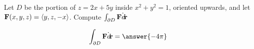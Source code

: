 \documentclass{ximera}
\author{David Guichard \and Neal Koblitz \and H. Jerome Keisler \and Albert Scheller \and Barry Balof \and Mike Wills \and Matthew Carr}
\begin{document}
\begin{exercise}




Let $D$ be the portion of $z=2x+5y$ inside $x^2+y^2=1$, oriented upwards, and let $\mathbf{F}(x,y,z)=\left\langle y,z,-x\right\rangle$. Compute $\int_{\partial D}\mathbf{F}\dot{\mathop{}\!d\!}\mathbf{r}$

\begin{prompt}
\[
\int_{\partial D}\vec{F}\dot\d\vec{r}=\answer{-4\pi}
\]
\end{prompt}


\end{exercise}
\end{document}
